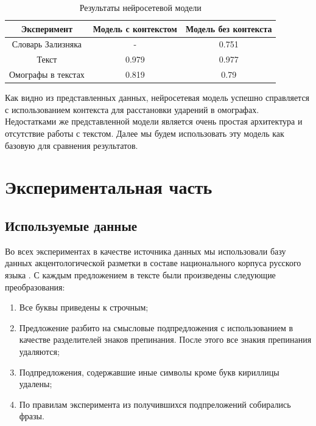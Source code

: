 \documentclass[14pt, a4paper, russian]{extreport}
\begin{document}
\begin{table}[H]
		\caption{Результаты нейросетевой модели}
	
	\begin{small}
		\begin{center}
			\begin{tabular}{|c|c|c|}
				\hline
				   Эксперимент     & Модель с контекстом & Модель без контекста   \\ \hline
				Словарь Зализняка  &          -          &        0.751           \\ \hline
				      Текст        &        0.979        &        0.977          \\ \hline
				Омографы в текстах &        0.819        &         0.79           \\ \hline
			\end{tabular}
		\end{center}
	\end{small}
	\label{table:base_text}
\end{table}

Как видно из представленных данных, нейросетевая модель успешно справляется с использованием контекста для расстановки ударений в омографах. Недостатками же представленной модели является очень простая архитектура и отсутствие работы с текстом. Далее мы будем использовать эту модель как базовую для сравнения результатов. 


\newpage
\chapter{Экспериментальная часть}
\section{Используемые данные}
\label{prepare}

Во всех экспериментах в качестве источника данных мы использовали базу данных акцентологической разметки в составе национального корпуса русского языка \cite{grishina}. С каждым предложением в тексте были произведены следующие преобразования:
\begin{enumerate}[  1{)} ]
	\item Все буквы приведены к строчным;
	\item Предложение разбито на смысловые подпредложения с использованием  в качестве разделителей знаков препинания. После этого все знакия препинания удаляются;
	\item Подпредложения, содержавшие  иные символы кроме букв  кириллицы удалены;
	\item По правилам эксперимента из получившихся подпреложений собирались фразы.
\end{enumerate}
\end{document}
